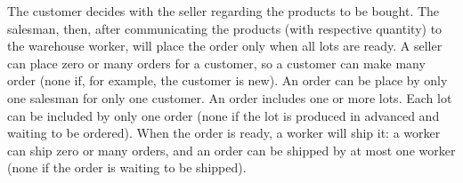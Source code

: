 The customer decides with the seller regarding the products to be bought. The salesman, then, after communicating the products (with respective quantity) to the warehouse worker, will place the order only when all lots are ready. A seller can place zero or many orders for a customer, so a customer can make many order (none if, for example, the customer is new). An order can be place by only one salesman for only one customer. An order includes one or more lots. Each lot can be included by only one order (none if the lot is produced in advanced and waiting to be ordered).
When the order is ready, a worker will ship it: a worker can ship zero or many orders, and an order can be shipped by at most one worker (none if the order is waiting to be shipped).

